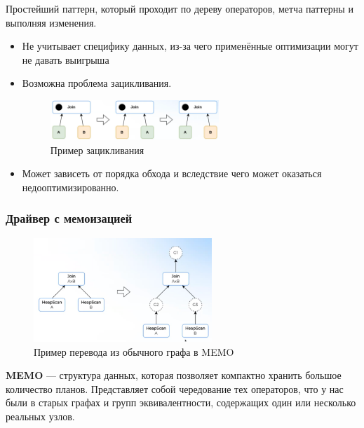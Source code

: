 \documentclass[11pt]{article}
\begin{document}
    Простейший паттерн, который проходит по дереву операторов, метча паттерны и выполняя изменения.

    \begin{itemize}[label=-]
        \item Не учитывает специфику данных, из-за чего применённые оптимизации могут не давать выигрыша
        \item Возможна проблема зацикливания.
        \begin{figure}[h!]
            \centering
            \includegraphics[width=0.6\textwidth]{Pictures/Optimisations/Зацикливание}
            \caption{Пример зацикливания}
            \label{fig:cycle}
        \end{figure}
        \item Может зависеть от порядка обхода и вследствие чего может оказаться недооптимизированно.
    \end{itemize}

    \subsubsection*{Драйвер с мемоизацией}

    \begin{figure}[h!]
        \centering
        \includegraphics[width=0.6\textwidth]{Pictures/Memo/Граф в Memo}
        \caption{Пример перевода из обычного графа в MEMO}
        \label{fig:graph_to_memo}
    \end{figure}

    \textbf{MEMO} --- структура данных, которая позволяет компактно хранить большое количество планов.
    Представляет собой чередование тех операторов, что у нас были в старых графах и групп эквивалентности, содержащих один или несколько реальных узлов.
\end{document}
